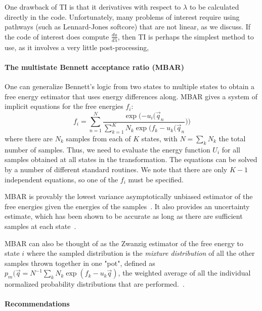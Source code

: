 \documentclass[9pt,bestpractices]{livecoms}
\begin{document}
One drawback of TI is that it derivatives with respect to $\lambda$ to be calculated directly in the code. Unfortunately, many problems of interest
require using pathways (such as Lennard-Jones softcore) that are not linear, as we discuss.  If the code of interest does compute $\frac{du}{d\lambda}$, then TI is perhaps the simplest method to use, as it involves a very little post-processing,

\paragraph{The multistate Bennett acceptance ratio (MBAR)}

One can generalize Bennett's logic from two states to multiple states to obtain a free energy estimator that uses energy differences along.  MBAR gives a system of implicit equations for the free energies $f_i$:
\begin{equation}
f_i = \sum_{n=1}^{N} \frac{\exp(-u_i(\vec{q}_n}{\sum_{k=1}^K N_k \exp(f_k-u_k(\vec{q}_n}))
\end{equation}
where there are $N_k$ samples from each of $K$ states, with $N=\sum_k N_k$ the total number of samples. Thus, we need to evaluate the energy function $U_i$ for all samples obtained at all states in the transformation. The equations can be solved by a number of different standard routines.  We note that there are only $K-1$ independent equations, so one of the $f_i$ must be specified.

MBAR is provably the lowest variance asymptotically unbiased estimator of the free energies given the energies of the samples~\cite{tan2004likelihood}. It also provides an uncertainty estimate, which has been shown to be accurate as long as there are sufficient samples at each state~\cite{paliwal2011benchmark}.

MBAR can also be thought of as the Zwanzig estimator of the free energy to state $i$ where the sampled distribution is the \textit{mixture distribution} of all the other samples thrown together in one "pot", defined as $p_m(\vec{q} = N^{-1} \sum_k  N_k \exp(f_k-u_k\vec{q})$, the weighted average of all the individual normalized probability distributions that are performed.~\cite{shirts2003equilibrium}.

\paragraph{Recommendations}
\end{document}
